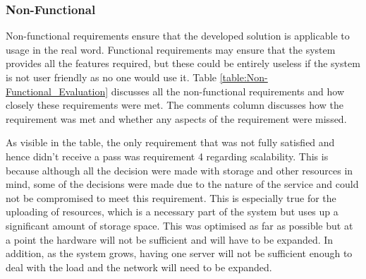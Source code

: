 \subsubsection{Non-Functional}

Non-functional requirements ensure that the developed solution is applicable to usage in the real word. Functional requirements may ensure that the system provides all the features required, but these could be entirely useless if the system is not user friendly as no one would use it. Table \ref{table:Non-Functional_Evaluation} discusses all the non-functional requirements and how closely these requirements were met. The comments column discusses how the requirement was met and whether any aspects of the requirement were missed. 

As visible in the table, the only requirement that was not fully satisfied and hence didn't receive a pass was requirement 4 regarding scalability. This is because although all the decision were made with storage and other resources in mind, some of the decisions were made due to the nature of the service and could not be compromised to meet this requirement. This is especially true for the uploading of resources, which is a necessary part of the system but uses up a significant amount of storage space. This was optimised as far as possible but at a point the hardware will not be sufficient and will have to be expanded. In addition, as the system grows, having one server will not be sufficient enough to deal with the load and the network will need to be expanded.

